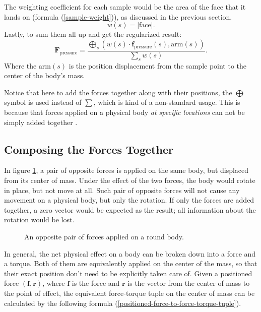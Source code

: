 The weighting coefficient for each sample would be the area of the face that it lands on (formula (\ref{sample-weight})), as discussed in the previous section.
\begin{equation}
	w(s)=|\text{face}|.
	\label{sample-weight}
\end{equation}
Lastly, to sum them all up and get the regularized result:
\begin{equation}
	\mathbf{F}_{\text{pressure}}=\frac
		{
			\bigoplus_{s}
			\left(
				w(s)\cdot\mathbf{f}_{\text{pressure}}(s)
				,
				\text{arm}(s)
			\right)
		}
		{\sum_{s}w(s)}.
	\label{net-pressure-force}
\end{equation}
Where the $\text{arm}(s)$ is the position displacement from the sample point to the center of the body's mass.

Notice that here to add the forces together along with their positions, the $\bigoplus$ symbol is used instead of $\sum$, which is kind of a non-standard usage.
This is because that forces applied on a physical body \emph{at specific locations} can not be simply added together \cite{mirtich1996impulse}.

\subsection{Composing the Forces Together}

In figure \ref{force-pair}, a pair of opposite forces is applied on the same body, but displaced from its center of mass.
Under the effect of the two forces, the body would rotate in place, but not move at all.
Such pair of opposite forces will not cause any movement on a physical body, but only the rotation.
If only the forces are added together, a zero vector would be expected as the result; all information about the rotation would be lost.

\begin{figure}[h]
	\centering
	\scalebox{0.8}{
		\begin{tikzpicture}
			\filldraw[color=black, fill=lightgray, line width=1pt] (0,0) circle (2);
			\draw[-latex, line width=1pt] (2,0) -- ++(0,-2);
			\draw[-latex, line width=1pt] (-2,0) -- ++(0,+2);
		\end{tikzpicture}
	}
	\caption{An opposite pair of forces applied on a round body.}
	\label{force-pair}
\end{figure}

In general, the net physical effect on a body can be broken down into a force and a torque.
Both of them are equivalently applied on the center of the mass, so that their exact position don't need to be explicitly taken care of.
Given a positioned force $(\mathbf{f}, \mathbf{r})$, where $\mathbf{f}$ is the force and $\mathbf{r}$ is the vector from the center of mass to the point of effect, the equivalent force-torque tuple on the center of mass can be calculated by the following formula (\ref{positioned-force-to-force-torque-tuple}).


